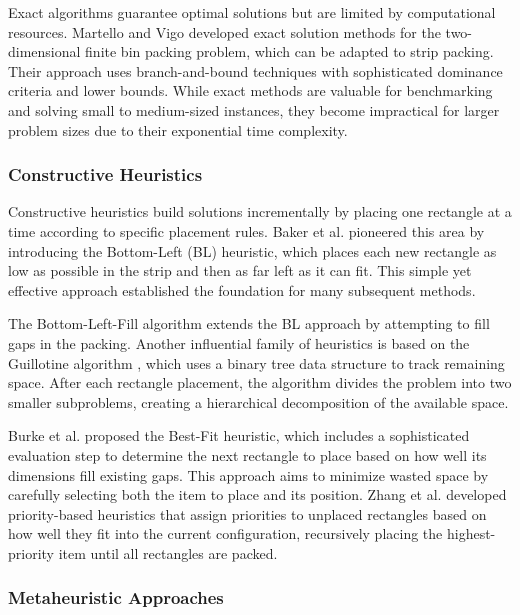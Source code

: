 \documentclass[11pt,a4paper]{article}
\begin{document}
Exact algorithms guarantee optimal solutions but are limited by computational resources. Martello and Vigo \cite{martello1998} developed exact solution methods for the two-dimensional finite bin packing problem, which can be adapted to strip packing. Their approach uses branch-and-bound techniques with sophisticated dominance criteria and lower bounds. While exact methods are valuable for benchmarking and solving small to medium-sized instances, they become impractical for larger problem sizes due to their exponential time complexity.

\subsubsection{Constructive Heuristics}

Constructive heuristics build solutions incrementally by placing one rectangle at a time according to specific placement rules. Baker et al. \cite{baker1980} pioneered this area by introducing the Bottom-Left (BL) heuristic, which places each new rectangle as low as possible in the strip and then as far left as it can fit. This simple yet effective approach established the foundation for many subsequent methods.

The Bottom-Left-Fill algorithm \cite{chazelle1983} extends the BL approach by attempting to fill gaps in the packing. Another influential family of heuristics is based on the Guillotine algorithm \cite{jylanki2010}, which uses a binary tree data structure to track remaining space. After each rectangle placement, the algorithm divides the problem into two smaller subproblems, creating a hierarchical decomposition of the available space.

Burke et al. \cite{burke2004} proposed the Best-Fit heuristic, which includes a sophisticated evaluation step to determine the next rectangle to place based on how well its dimensions fill existing gaps. This approach aims to minimize wasted space by carefully selecting both the item to place and its position. Zhang et al. \cite{zhang2006,zhang2016} developed priority-based heuristics that assign priorities to unplaced rectangles based on how well they fit into the current configuration, recursively placing the highest-priority item until all rectangles are packed.

\subsubsection{Metaheuristic Approaches}
\end{document}
